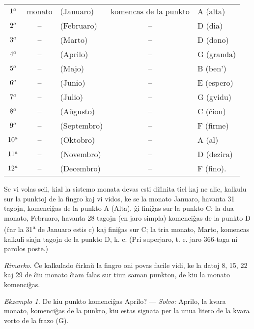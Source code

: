 \begin{table}[h]
\centering
\begin{tabu} to
 $1^{\small{a}}$  & monato & (Januaro)    & komencas de la punkto & A (alta)\\
 $2^{\small{a}}$  &   --   & (Februaro)   &          --           & D (dia)\\
 $3^{\small{a}}$  &   --   & (Marto)      &          --           & D (dono)\\
 $4^{\small{a}}$  &   --   & (Aprilo)     &          --           & G (granda)\\
 $5^{\small{a}}$  &   --   & (Majo)       &          --           & B (ben')\\
 $6^{\small{a}}$  &   --   & (Junio)      &          --           & E (espero)\\
 $7^{\small{a}}$  &   --   & (Julio)      &          --           & G (gvidu)\\
 $8^{\small{a}}$  &   --   & (A\u ugusto) &          --           & C (\^cion)\\
 $9^{\small{a}}$  &   --   & (Septembro)  &          --           & F (firme)\\
 $10^{\small{a}}$ &   --   & (Oktobro)    &          --           & A (al)\\
 $11^{\small{a}}$ &   --   & (Novembro)   &          --           & D (dezira)\\
 $12^{\small{a}}$ &   --   & (Decembro)   &          --           & F (fino).\\
\end{tabu}
\end{table}

   Se vi volas scii, kial la sistemo monata devas esti difinita tiel
kaj ne alie, kalkulu sur la punktoj de la fingro kaj vi vidos, ke se
la monato Januaro, havanta 31 tagojn, komenci\^gas de la punkto A
(Alta), \^gi fini\^gas sur la punkto C; la dua monato, Februaro,
havanta 28 tagojn (en jaro simpla) komenci\^gas de la punkto D
(\^car la 31\textsuperscript{a} de Januaro estis c) kaj fini\^gas sur C; la tria
monato, Marto, komencas kalkuli siajn tagojn de la punkto D, k. c.
(Pri superjaro, t. e. jaro 366-taga ni parolos poste.)

{\it Rimarko.} \^Ce kalkulado \^cirka\u u la fingro oni povas facile
vidi, ke la datoj 8, 15, 22 kaj 29 de \^ciu monato \^ciam falas sur
tiun saman punkton, de kiu la monato komenci\^gas.

{\sl Ekzemplo 1.} De kiu punkto komenci\^gas Aprilo?
--- {\sl Solvo:} Aprilo, la kvara monato, komenci\^gas de la punkto, kiu estas
signata per la unua litero de la kvara vorto de la frazo (G).

